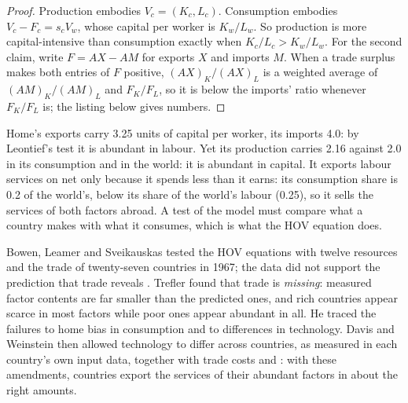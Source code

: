 \begin{proof}
Production embodies $V_c = (K_c, L_c)$. Consumption embodies $V_c - F_c = s_c V_w$, whose
capital per worker is $K_w/L_w$. So production is more capital-intensive than
consumption exactly when $K_c/L_c > K_w/L_w$. For the second claim, write $F = A X - A M$ for
exports $X$ and imports $M$. When a trade surplus makes both entries of $F$ positive,
$(A X)_K / (A X)_L$ is a weighted average of $(A M)_K/(A M)_L$ and $F_K/F_L$, so it is
below the imports' ratio whenever $F_K / F_L$ is; the listing below gives numbers.
\end{proof}

\label{lst:b3:factor-endowments:leamer}

\label{out:b3:factor-endowments:leamer}

Home's exports carry 3.25 units of capital per worker, its imports 4.0: by Leontief's
test it is abundant in labour. Yet its production carries 2.16 against 2.0 in its
consumption and in the world: it is abundant in capital. %
It exports labour services on net only because it spends less than it earns: its
consumption share is 0.2 of the world's, below its share of the world's labour (0.25),
so it sells the services of both factors abroad. A test of the
model must compare what a country makes with what it consumes, which is what the
HOV equation does.

\begin{record}
Bowen, Leamer and Sveikauskas tested the HOV equations with twelve resources and
the trade of twenty-seven countries in 1967; the data did not support the
prediction that trade reveals . %
Trefler found that trade is \emph{missing}: measured factor contents are far
smaller than the predicted ones, and rich countries appear scarce in most
factors while poor ones appear abundant in all. He traced the failures to home
bias in consumption and to differences in technology. %
Davis and Weinstein then allowed technology to differ across countries, as
measured in each country's own input data, together with trade costs and
: with these amendments, countries export the services of their
abundant factors in about the right amounts. %
\end{record}

